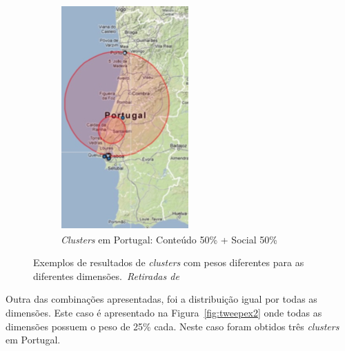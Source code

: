 \begin{figure}[h]
\begin{subfigure}[b]{.2\textwidth}
  \includegraphics[width=0.99\linewidth]{./figures/tweeprofiles/extp4}
  \caption{\textit{Clusters} em Portugal: Conteúdo 50\% + Social 50\%}
  \label{fig:sfig4}
\end{subfigure}
\caption{Exemplos de resultados de \textit{clusters} com pesos diferentes para as diferentes dimensões.~\textit{Retiradas de}~\cite{Cunha2013}}
\label{fig:tweepex1}
\end{figure}

Outra das combinações apresentadas, foi a distribuição igual por todas as dimensões. Este caso é apresentado na Figura~\ref{fig:tweepex2} onde todas as dimensões possuem o peso de 25\% cada. Neste caso foram obtidos três \textit{clusters} em Portugal.

